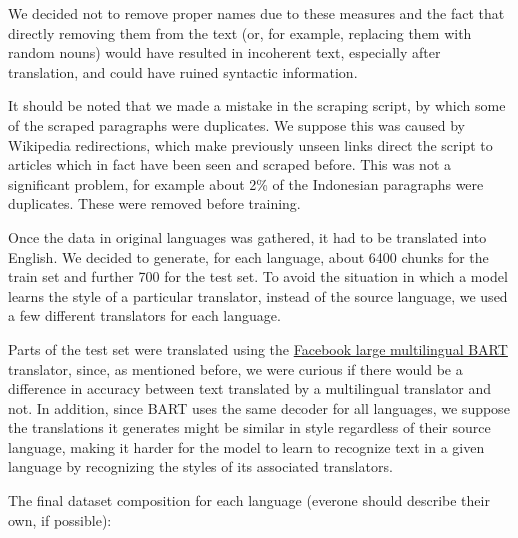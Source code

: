 \documentclass[twocolumn]{article}
\begin{document}
We decided not to remove proper names due to these measures and the fact that directly removing them from the text (or, for example, replacing them with random nouns) would have resulted in incoherent text, especially after translation, and could have ruined syntactic information.

It should be noted that we made a mistake in the scraping script, by which some of the scraped paragraphs were duplicates. We suppose this was caused by Wikipedia redirections, which make previously unseen links direct the script to articles which in fact have been seen and scraped before. This was not a significant problem, for example about 2\% of the Indonesian paragraphs were duplicates. These were removed before training.

Once the data in original languages was gathered, it had to be translated into English. We decided to generate, for each language, about 6400 chunks for the train set and further 700 for the test set. To avoid the situation in which a model learns the style of a particular translator, instead of the source language, we used a few different translators for each language.

Parts of the test set were translated using the \href{https://huggingface.co/facebook/mbart-large-50-many-to-one-mmt}{Facebook large multilingual BART} translator, since, as mentioned before, we were curious if there would be a difference in accuracy between text translated by a multilingual translator and not. In addition, since BART uses the same decoder for all languages, we suppose the translations it generates might be similar in style regardless of their source language, making it harder for the model to learn to recognize text in a given language by recognizing the styles of its associated translators.

The final dataset composition for each language (everone should describe their own, if possible):
\end{document}

